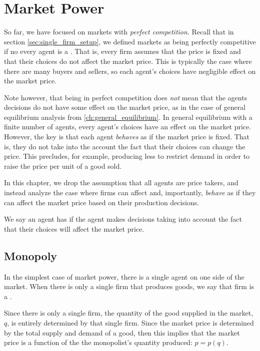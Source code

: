 \chapter{Market Power}
So far, we have focused on markets with \emph{perfect competition}. Recall that in section \ref{sec:single_firm_setup}, we defined markets as being perfectly competitive if no every agent is a . That is, every firm assumes that the price is fixed and that their choices do not affect the market price. This is typically the case where there are many buyers and sellers, so each agent's choices have negligible effect on the market price. 

Note however, that being in perfect competition does \emph{not} mean that the agents decisions do not have some effect on the market price, as in the case of general equilibrium analysis from \ref{ch:general_equilibrium}. In general equilibrium with a finite number of agents, every agent's choices have an effect on the market price. However, the key is that each agent \emph{behaves} as if the market price is fixed. That is, they do not take into the account the fact that their choices can change the price. This precludes, for example, producing less to restrict demand in order to raise the price per unit of a good sold. 

In this chapter, we drop the assumption that all agents are price takers, and instead analyze the case where firms can affect and, importantly, \emph{behave} as if they can affect the market price based on their production decisions. 

\begin{definition*}
    We say an agent has  if the agent makes decisions taking into account the fact that their choices will affect the market price. 
\end{definition*}

\section{Monopoly}
In the simplest case of market power, there is a single agent on one side of the market. When there is only a single firm that produces goods, we say that firm is a . 

Since there is only a single firm, the quantity of the good supplied in the market, $q$, is entirely determined by that single firm. Since the market price is determined by the total supply and demand of a good, then this implies that the market price is a function of the the monopolist's quantity produced: $p = p(q)$. 

